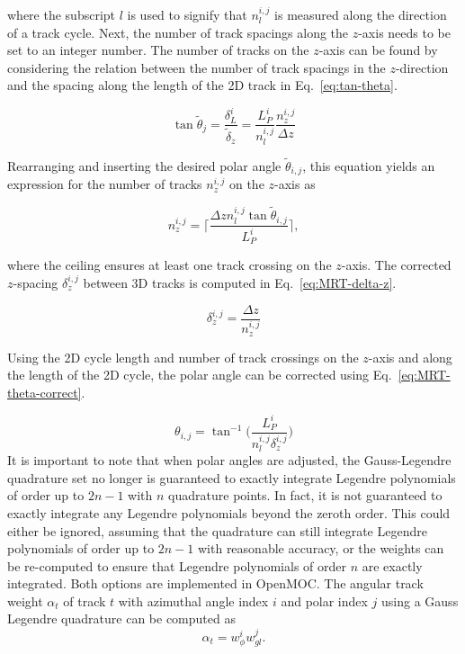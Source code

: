 \noindent
where the subscript $l$ is used to signify that $n_l^{i,j}$ is measured along the direction of a track cycle. Next, the number of track spacings along the $z$-axis needs to be set to an integer number. The number of tracks on the $z$-axis can be found by considering the relation between the number of track spacings in the $z$-direction and the spacing along the length of the 2D track in Eq.~\ref{eq:tan-theta}.

\begin{equation}
\tan{\tilde{\theta}_{j}} = \frac{\delta_L^i}{\tilde{\delta}_z} = \frac{L_P^i}{n_l^{i,j}} \frac{n_z^{i,j}}{\Delta z}
\label{eq:tan-theta}
\end{equation}

\noindent
Rearranging and inserting the desired polar angle $\tilde{\theta}_{i,j}$, this equation yields an expression for the number of tracks $n_z^{i,j}$ on the $z$-axis as

\begin{equation}
n_z^{i,j} = \Bigg\lceil\frac{\Delta z n_l^{i,j} \tan{\tilde{\theta}_{i,j}}}{L_P^i} \Bigg\rceil,
\label{eq:MRT-nz}
\end{equation}

\noindent
where the ceiling ensures at least one track crossing on the $z$-axis. The corrected $z$-spacing $\delta_z^{i,j}$ between 3D tracks is computed in Eq.~\ref{eq:MRT-delta-z}.

\begin{equation}
\delta_z^{i,j} = \frac{\Delta z}{n_z^{i,j}}
\label{eq:MRT-delta-z}
\end{equation}

\noindent
Using the 2D cycle length and number of track crossings on the $z$-axis and along the length of the 2D cycle, the polar angle can be corrected using Eq.~\ref{eq:MRT-theta-correct}.

\begin{equation}
\theta_{i,j} = \tan^{-1} \bigg( \frac{L_P^i}{n_l^{i,j} \delta_z^{i,j}}\bigg)
\label{eq:MRT-theta-correct}
\end{equation}
It is important to note that when polar angles are adjusted, the Gauss-Legendre quadrature set no longer is guaranteed to exactly integrate Legendre polynomials of order up to $2n-1$ with $n$ quadrature points. In fact, it is not guaranteed to exactly integrate any Legendre polynomials beyond the zeroth order. This could either be ignored, assuming that the quadrature can still integrate Legendre polynomials of order up to $2n-1$ with reasonable accuracy, or the weights can be re-computed to ensure that Legendre polynomials of order $n$ are exactly integrated. Both options are implemented in OpenMOC. The angular track weight $\alpha_t$ of track $t$ with azimuthal angle index $i$ and polar index $j$ using a Gauss Legendre quadrature can be computed as
\begin{equation}
\alpha_t = w_{\phi}^i w_{\textit{gl}}^j .
\end{equation}

